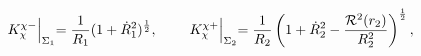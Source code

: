 \begin{equation}
\label{ic2}
K^{\chi-}_{\chi}\Bigl|_{\Sigma_{1}}=\frac{1}{R_{1}}(1+\dot{R}_{1}^2)^\frac{1}{2}
, \hspace{0.8cm}K^{\chi
+}_{\chi}\Bigl|_{\Sigma_{2}}=\frac{1}{R_{2}}
\left(1+\dot{R}_{2}^2-\frac{{{\cal
R}}^2(r_{2})}{R_{2}^2}\right)^{\frac{1}{2}},
\end{equation}


